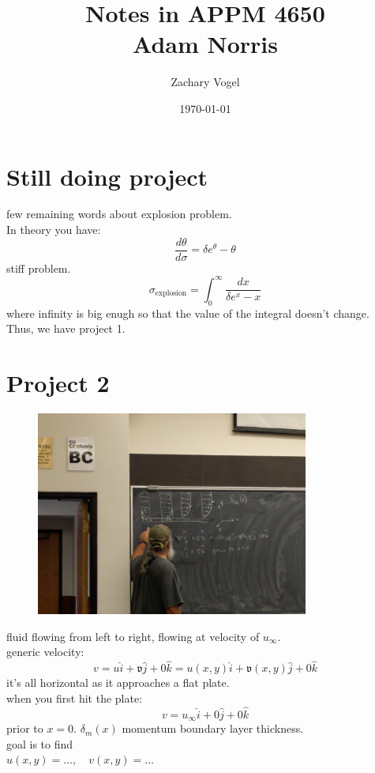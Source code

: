 \documentclass{article}
\begin{document}
\author{Zachary Vogel}
\date{\today}
\title{Notes in APPM 4650\\Adam Norris}

\maketitle

\section{Still doing project}
few remaining words about explosion problem.\\
In theory you have:\\
\[\frac{d\theta}{d\sigma}=\delta e^{\theta}-\theta\]
stiff problem.\\
\[\sigma_{\text{explosion}}=\int_0^\infty \frac{dx}{\delta e^x-x}\]
where infinity is big enugh so that the value of the integral doesn't change.\\

Thus, we have project 1.\\

\section{Project 2}

\begin{figure}[h!]
    \centering
    \includegraphics[clip=true,trim={45cm 45cm 45cm 40cm},width=0.8\textwidth]{flow1.jpg}
\end{figure}

fluid flowing from left to right, flowing at velocity of $u_{\infty}$.\\
generic velocity:\\
\[v=u\hat{i}+\mathfrak{v}\hat{j}+0\hat{k}=u(x,y)\hat{i}+\mathfrak{v}(x,y)\hat{j}+0\hat{k}\]
it's all horizontal as it approaches a flat plate.\\
when you first hit the plate:\\
\[v=u_{\infty}\hat{i}+0\hat{j}+0\hat{k}\]
prior to $x=0$.
$\delta_m(x)$ momentum boundary layer thickness.\\
goal is to find\\
$u(x,y)=\dots,\quad v(x,y)=\dots$\\
\end{document}
